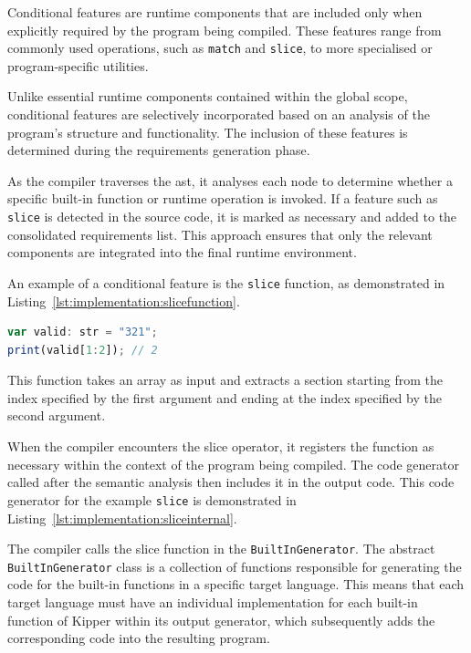 Conditional features are runtime components that are included only when explicitly required by the program being compiled. These features range from commonly used operations, such as \lstinline|match| and \lstinline|slice|, to more specialised or program-specific utilities.

Unlike essential runtime components contained within the global scope, conditional features are selectively incorporated based on an analysis of the program's structure and functionality. The inclusion of these features is determined during the requirements generation phase.

As the compiler traverses the \acrshort{ast}, it analyses each node to determine whether a specific built-in function or runtime operation is invoked. If a feature such as \lstinline|slice| is detected in the source code, it is marked as necessary and added to the consolidated requirements list. This approach ensures that only the relevant components are integrated into the final runtime environment.

An example of a conditional feature is the \lstinline|slice| function, as demonstrated in Listing~\ref{lst:implementation:slicefunction}.

\begin{lstlisting}[language=TypeScript,caption=The Slice operator being used on a string,label=lst:implementation:slicefunction]
var valid: str = "321";
print(valid[1:2]); // 2
\end{lstlisting}

This function takes an array as input and extracts a section starting from the index specified by the first argument and ending at the index specified by the second argument.

When the compiler encounters the slice operator, it registers the function as necessary within the context of the program being compiled. The code generator called after the semantic analysis then includes it in the output code. This code generator for the example \lstinline|slice| is demonstrated in Listing~\ref{lst:implementation:sliceinternal}.

The compiler calls the slice function in the \lstinline|BuiltInGenerator|. The abstract \lstinline|BuiltInGenerator| class is a collection of functions responsible for generating the code for the built-in functions in a specific target language. This means that each target language must have an individual implementation for each built-in function of Kipper within its output generator, which subsequently adds the corresponding code into the resulting program.


